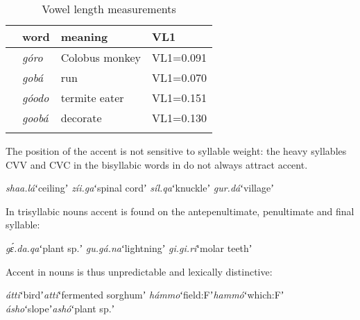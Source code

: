 \documentclass[output=paper]{LSP/langsci}
\begin{document}
\begin{table}
\caption{Vowel length measurements}
\label{tab:Petrollino:3}
 \begin{tabular}{llll} %
  \lsptoprule
    & word & meaning & VL1\\ %
  \midrule
    &   \textit{góro} & Colobus monkey &  VL1=0.091\\
    &   \textit{gobá} & run &  VL1=0.070 \\
    &   \textit{góodo} & termite eater & VL1=0.151\\
    &	\textit{goobá} & decorate & VL1=0.130\\
  \lspbottomrule
 \end{tabular}
\end{table}
The position of the accent is not sensitive to syllable weight: the heavy syllables CVV and CVC in the bisyllabic words in  do not always attract accent.
\begin{exe}
	\ex \label{ex:Petrollino:lexicalstress} \begin{xlist}
	\ex \textit{shaa.lá}\hspace{7mm}ʻceilingʼ
    \ex \textit{zíi.ga}\hspace{10mm}ʻspinal cordʼ
    \ex \textit{síl.qa}\hspace{10mm}ʻknuckleʼ
    \ex \textit{gur.dá}\hspace{9mm}ʻvillageʼ
    \end{xlist}
\end{exe}
In trisyllabic nouns accent is found on the antepenultimate, penultimate and final syllable:
\begin{exe}
	\ex \begin{xlist}
	\ex \textit{gɛ́.da.qa}\hspace{4mm}ʻplant sp.ʼ
    \ex \textit{gu.gá.na}\hspace{4mm}ʻlightningʼ
    \ex \textit{gi.gi.rí}\hspace{7mm}ʻmolar teethʼ
    \end{xlist}
\end{exe}
Accent in nouns is thus unpredictable and lexically distinctive: 
\begin{exe}
	\ex \begin{xlist}
	\ex \textit{átti}\hspace{12mm}ʻbirdʼ\hspace{10mm}\textit{attí}\hspace{10mm}ʻfermented sorghumʼ
    \ex \textit{hámmo}\hspace{6mm}ʻfield:Fʼ\hspace{6mm}\textit{hammó}\hspace{5mm}ʻwhich:Fʼ
    \ex \textit{ásho}\hspace{11mm}ʻslopeʼ\hspace{8mm}\textit{ashó}\hspace{9mm}ʻplant sp.ʼ
\end{xlist} \label{ex:Petrollino:minimalpairs1}
\end{exe}
\end{document}
